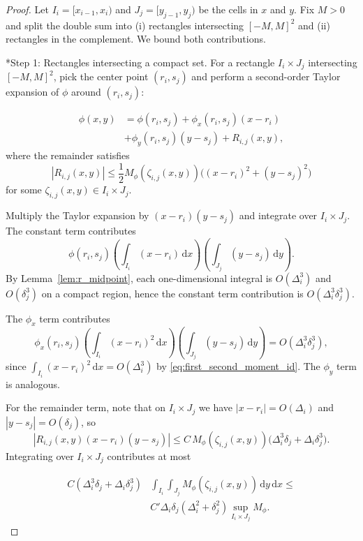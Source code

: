 \documentclass[10pt,a4paper]{amsart}
\newcommand{\abs}[1]{\left\lvert #1 \right\rvert}
\newcommand{\dd}{\,\mathrm{d}}
\providecommand{\paragraph}{}
\begin{document}
\begin{proof}
Let $I_i=[x_{i-1},x_i)$ and $J_j=[y_{j-1},y_j)$ be the cells in $x$ and $y$. Fix $M>0$ and split the double sum into (i) rectangles intersecting $[-M,M]^2$ and (ii) rectangles in the complement. We bound both contributions.

\paragraph*{Step 1: Rectangles intersecting a compact set.}
For a rectangle $I_i\times J_j$ intersecting $[-M,M]^2$, pick the center point $(r_i,s_j)$ and perform a second-order Taylor expansion of $\phi$ around $(r_i,s_j)$:

\begin{align*}
    \phi(x,y) &=\phi(r_i,s_j)+\phi_x(r_i,s_j)(x-r_i)\\
    &+\phi_y(r_i,s_j)(y-s_j)+R_{i,j}(x,y),
\end{align*}
where the remainder satisfies
\[
\abs{R_{i,j}(x,y)}
\le \frac{1}{2} M_\phi(\zeta_{i,j}(x,y))\bigl((x-r_i)^2+(y-s_j)^2\bigr)
\]
for some $\zeta_{i,j}(x,y)\in I_i\times J_j$.

Multiply the Taylor expansion by $(x-r_i)(y-s_j)$ and integrate over $I_i\times J_j$. The constant term contributes
\[
\phi(r_i,s_j)\left(\int_{I_i}(x-r_i)\dd x\right)\left(\int_{J_j}(y-s_j)\dd y\right).
\]
By Lemma~\ref{lem:r_midpoint}, each one-dimensional integral is $O(\Delta_i^3)$ and $O(\delta_j^3)$ on a compact region, hence the constant term contribution is $O(\Delta_i^3\delta_j^3)$.

The $\phi_x$ term contributes
\[
\phi_x(r_i,s_j)\left(\int_{I_i}(x-r_i)^2\dd x\right)\left(\int_{J_j}(y-s_j)\dd y\right)
=O(\Delta_i^3\delta_j^3),
\]
since $\int_{I_i}(x-r_i)^2\dd x=O(\Delta_i^3)$ by \eqref{eq:first_second_moment_id}. The $\phi_y$ term is analogous.

For the remainder term, note that on $I_i\times J_j$ we have $\abs{x-r_i}=O(\Delta_i)$ and $\abs{y-s_j}=O(\delta_j)$, so
\[
\abs{R_{i,j}(x,y)(x-r_i)(y-s_j)}
\le C\, M_\phi(\zeta_{i,j}(x,y))\bigl(\Delta_i^3\delta_j+\Delta_i\delta_j^3\bigr).
\]
Integrating over $I_i\times J_j$ contributes at most

\begin{align*}
C\left(\Delta_i^3\delta_j+\Delta_i\delta_j^3\right)&\int_{I_i}\int_{J_j} M_\phi(\zeta_{i,j}(x,y))\dd y\dd x
\le\\
&C'\Delta_i\delta_j\left(\Delta_i^2+\delta_j^2\right)\sup_{I_i\times J_j}M_\phi.
\end{align*}


\end{proof}
\end{document}
